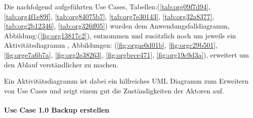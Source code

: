 Die nachfolgend aufgeführten Use Cases, Tabellen:(\ref{tab:org09f7d94}, \ref{tab:org4f1e89f},
\ref{tab:org84075b7}, \ref{tab:org7e30143}, \ref{tab:org32a8377}, \ref{tab:org2b12346}, \ref{tab:org326ff05})
wurden dem Anwendungsfalldiagramm, Abbildung:(\ref{fig:org13817c2}), entnommen und
zusätzlich noch um jeweils ein Aktivitätsdiagramm , Abbildungen:
(\ref{fig:orgae0d01b}, \ref{fig:orgc29b501}, \ref{fig:orge7a6b7a},
\ref{fig:org2e38263}, \ref{fig:orgbece471}, \ref{fig:org19c9d3a}), erweitert
um den Ablauf verständlicher zu machen.

Ein Aktivitätsdiagramm ist dabei ein hilfreiches UML Diagramm zum Erweitern von
Use Cases und zeigt einem gut die Zuständigkeiten der Aktoren auf.

\paragraph{Use Case 1.0 Backup erstellen}
\label{sec:org271f4f4}

